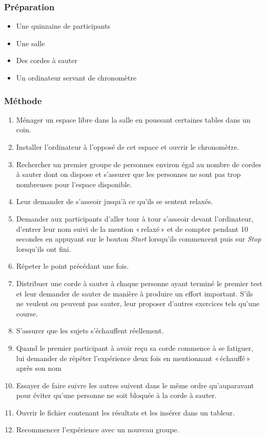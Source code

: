 \documentclass[12pt,fleqn,oneside,french,openany]{book} %
\begin{document}
\subsubsection{Préparation} \label{sssec:preparation2.2}
\begin{itemize}
	\item Une quinzaine de participants 
	\item Une salle
	\item Des cordes à sauter
	\item Un ordinateur servant de chronomètre
\end{itemize}

\subsubsection{Méthode} \label{sssec:methode2.2}
\begin{enumerate}
	\item Ménager un espace libre dans la salle en poussant certaines tables dans un coin.
	\item Installer l'ordinateur à l'opposé de cet espace et ouvrir le chronomètre.
	\item Rechercher un premier groupe de personnes environ égal au nombre de cordes à sauter dont on dispose et s'assurer que les personnes ne sont pas trop nombreuses pour l'espace disponible.
	\item Leur demander de s'asseoir jusqu'à ce qu'ils se sentent relaxés.
	\item Demander aux participants d'aller tour à tour s'asseoir devant l'ordinateur, d'entrer leur nom suivi de la mention «\,relaxé\,» et de compter pendant 10 secondes en appuyant sur le bouton \emph{Start} lorsqu'ils commencent puis sur \emph{Stop} lorsqu'ils ont fini.
	\item Répeter le point précédant une fois.
	\item Distribuer une corde à sauter à chaque personne ayant terminé le premier test et leur demander de sauter de manière à produire un effort important. S'ils ne veulent ou peuvent pas sauter, leur proposer d'autres exercices tels qu'une course.
	\item S'assurer que les sujets s'échauffent réellement.
	\item Quand le premier participant à avoir reçu sa corde commence à se fatiguer, lui demander de répéter l'expérience deux fois en mentionnant «\,échauffé\,» après son nom  \item Essayer de faire suivre les autres suivent dans le même ordre qu'auparavant pour éviter qu'une personne ne soit bloquée à la corde à sauter.
	\item Ouvrir le fichier contenant les résultats et les insérer dans un tableur.
	\item Recommencer l'expérience avec un nouveau groupe.
\end{enumerate}
\end{document}
